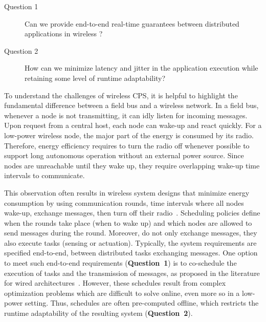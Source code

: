 \begin{research_questions}
  \begin{description}
    \item[Question 1]
    Can we provide end-to-end real-time guarantees between distributed applications in wireless \CPS?

    \item[Question 2]
    How can we minimize latency and jitter in the application execution while retaining some level of runtime adaptability?
  \end{description}
\end{research_questions}


To understand the challenges of wireless CPS, it is helpful to highlight the fundamental difference between a field bus and a wireless network. In a field bus, whenever a node is not transmitting, it can idly listen for incoming messages. Upon request from a central host, each node can {wake-up and react quickly}. For a low-power wireless node, the major part of the energy is consumed by its radio. Therefore, energy efficiency requires to turn the radio off whenever possible to support long autonomous operation without an external power source.
Since nodes are unreachable until they wake up, they require overlapping wake-up time intervals to communicate.

This observation often results in wireless system designs that minimize energy consumption by using communication rounds, \ie time intervals where all nodes wake-up, exchange messages, then turn off their radio~\cite{wirelessHART,watteyne2017Teaching,ferrari2012LWB,jacob2019Baloo}. Scheduling policies define when the rounds take place (\ie when to wake up) and which nodes are allowed to send messages during the round.
Moreover, \cps do not only exchange messages, they also execute tasks (\eg sensing or actuation).
Typically, the system requirements are specified end-to-end, \ie between distributed tasks exchanging messages.
One option to meet such end-to-end requirements (\textbf{Question~1}) is to co-schedule the execution of tasks and the transmission of messages, as proposed in the literature for wired architectures~\cite{abdelzaher1999combined, craciunas2016Combined, ashjaei2017Designing}.
However, these schedules result from complex optimization problems which are difficult to solve online, even more so in a low-power setting.
Thus, schedules are often pre-computed offline, which restricts the runtime adaptability of the resulting system (\textbf{Question~2}).

